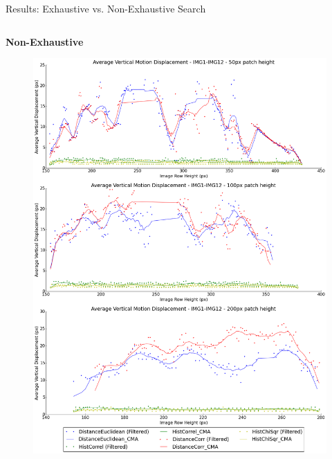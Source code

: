 \documentclass[10pt, compress]{beamer}
\begin{document}
\begin{frame}{Results: Exhaustive vs. Non-Exhaustive Search}


\vspace{-0.4cm}

\begin{columns}[T] %
\begin{column}{.48\textwidth}

\textbf{Non-Exhaustive}

\begin{figure}[ht!]
\centering
\vspace{0.1cm}
\includegraphics[scale=0.13]{flat_10cm_scaled}
\end{figure}


\end{column}
\end{columns}
\end{frame}
\end{document}
